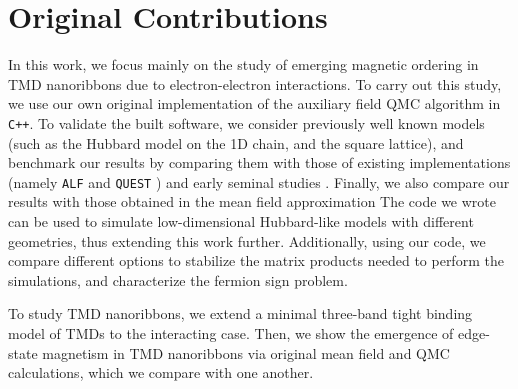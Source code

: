 \section{Original Contributions}
\label{sec:int_contributions}

In this work, we focus mainly on the study of emerging magnetic ordering in \ac{TMD} nanoribbons due to electron-electron interactions.
To carry out this study, we use our own original implementation of the auxiliary field \ac{QMC} algorithm in \texttt{C++}.
To validate the built software, we consider previously well known models (such as the Hubbard model on the \acs{1D} chain, and the square lattice), and benchmark our results by comparing them with those of existing implementations (namely \texttt{ALF} \cite{bercx_alf_2017} and \texttt{QUEST} \cite{noauthor_quest_2012}) and early seminal studies \cite{hirsch_discrete_1983,white_numerical_1989}.
Finally, we also compare our results with those obtained in the mean field approximation
The code we wrote can be used to simulate low-dimensional Hubbard-like models with different geometries, thus extending this work further.
Additionally, using our code, we compare different options to stabilize the matrix products needed to perform the simulations, and characterize the fermion sign problem.

To study \ac{TMD} nanoribbons, we extend a minimal three-band tight binding model \cite{liu_three-band_2013} of \acp{TMD} to the interacting case.
Then, we show the emergence of edge-state magnetism in \ac{TMD} nanoribbons via original mean field and \ac{QMC} calculations, which we compare with one another.